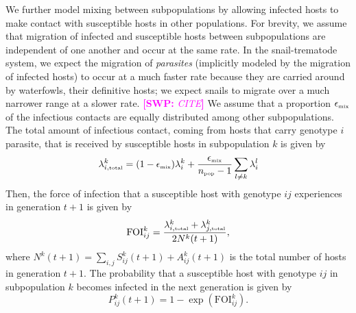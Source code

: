 \documentclass{article}\usepackage[]{graphicx}\usepackage[]{color}
\newcommand{\comment}[3]{\textcolor{#1}{\textbf{[#2: }\textit{#3}\textbf{]}}}
\newcommand{\swp}[1]{\comment{magenta}{SWP}{#1}}
\begin{document}
We further model mixing between subpopulations by allowing infected hosts to make contact with susceptible hosts in other populations.
For brevity, we assume that migration of infected and susceptible hosts between subpopulations are independent of one another and occur at the same rate.
In the snail-trematode system, we expect the migration of \emph{parasites} (implicitly modeled by the migration of infected hosts) to occur at a much faster rate because they are carried around by waterfowls, their definitive hosts; we expect snails to migrate over a much narrower range at a slower rate.
\swp{CITE}
We assume that a proportion $\epsilon_{\textrm{\tiny mix}}$ of the infectious contacts are equally distributed among other subpopulations.
The total amount of infectious contact, coming from hosts that carry genotype $i$ parasite, that is received by susceptible hosts in subpopulation $k$ is given by
\begin{equation}
\lambda_{i, \textrm{\tiny total}}^k = (1 - \epsilon_{\textrm{\tiny mix}}) \lambda_i^k + \frac{\epsilon_{\textrm{\tiny mix}}}{n_\textrm{\tiny pop}-1} \sum_{l \neq k} \lambda_i^l
\end{equation}
Then, the force of infection that a susceptible host with genotype $ij$ experiences in generation $t+1$ is given by
\begin{equation}
\mathrm{FOI}_{ij}^k = \frac{\lambda_{i, \textrm{\tiny total}}^k  + \lambda_{j, \textrm{\tiny total}}^k}{2 N^k(t+1)},
\end{equation}
where $N^k(t+1) = \sum_{i,j} S_{ij}^k(t+1) + A_{ij}^k(t+1)$ is the total number of hosts in generation $t+1$.
The probability that a susceptible host with genotype $ij$ in subpopulation $k$ becomes infected in the next generation is given by
\begin{equation}
P_{ij}^k(t+1) = 1 - \exp\left(\mathrm{FOI}_{ij}^k\right).
\end{equation}
\end{document}
